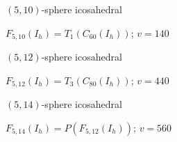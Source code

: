 \documentclass[%
pdf,
colorBG,
slideColor,
]{prosper}
\begin{document}
\begin{slide}{$(5,10)$-sphere icosahedral}
\begin{center}
\begin{minipage}{5.5cm}
\centering
{}\par
\end{minipage}
\hspace{0.1cm}
\begin{minipage}{5.5cm}
\centering
{}\par
\end{minipage}
\end{center}
\begin{center}
$F_{5,10}(I_h) = T_1(C_{60}(I_h))$; $v=140$
\end{center}
\end{slide}

\begin{slide}{$(5,12)$-sphere icosahedral}
\begin{center}
\begin{minipage}{5.5cm}
\centering
{}\par
\end{minipage}
\hspace{0.1cm}
\begin{minipage}{5.5cm}
\centering
{}\par
\end{minipage}
\end{center}
\begin{center}
$F_{5,12}(I_h) = T_3(C_{80}(I_h))$; $v=440$
\end{center}
\end{slide}

\begin{slide}{$(5,14)$-sphere icosahedral}
\begin{center}
\begin{minipage}{5.5cm}
\centering
{}\par
\end{minipage}
\hspace{0.1cm}
\begin{minipage}{5.5cm}
\centering
{}\par
\end{minipage}
\end{center}
\begin{center}
$F_{5,14}(I_h) = P(F_{5,12}(I_h))$; $v=560$
\end{center}
\end{slide}
\end{document}

